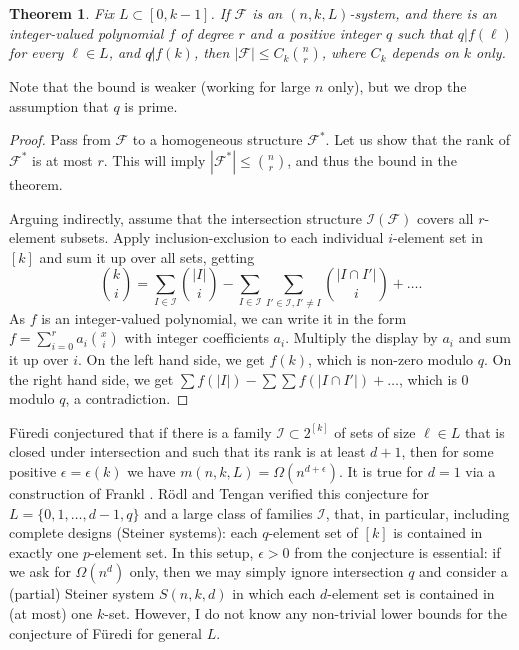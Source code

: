 \documentclass[graybox]{svmult}
\renewcommand{\le}{\leqslant}
\newcommand{\ff}{\mathcal{F}}
\newcommand{\m}{\mathcal}
\newtheorem{thm}{Theorem}
\begin{document}
\begin{thm}
   Fix $L\subset [0,k-1]$. If $\ff$ is an $(n,k,L)$-system, and there is an integer-valued polynomial  $f$ of degree $r$ and a positive integer  $q$ such that $q|f(\ell)$ for every $\ell\in L$, and $q\not | f(k)$, then $|\ff|\le C_k{n\choose r}$, where $C_k$ depends on $k$ only.
\end{thm}
Note that the bound is weaker (working for large $n$ only), but we drop the assumption that $q$ is prime.
\begin{proof}
  Pass from $\ff$ to a homogeneous structure $\ff^*$. Let us show that the rank of $\ff^*$ is at most $r$. This will imply $|\ff^*|\le {n\choose r}$, and thus the bound in the theorem.

  Arguing indirectly, assume that the intersection structure $\m I(\ff)$ covers all $r$-element subsets. Apply inclusion-exclusion to each individual $i$-element set in $[k]$ and sum it up over all sets, getting
  $${k\choose i} = \sum_{I\in \m I}{|I|\choose i}-\sum_{I\in \m I}\sum_{I'\in \m I, I'\ne I}{|I\cap I'|\choose i}+\ldots.$$
  As $f$ is an integer-valued polynomial, we can write it in the form $f = \sum_{i=0}^r a_i {x\choose i}$ with integer coefficients $a_i$. Multiply the display by $a_i$ and sum it up over $i$. On the left hand side, we get $f(k)$, which is non-zero modulo $q$. On the right hand side, we get $\sum f(|I|)-\sum \sum f(|I\cap I'|)+\ldots$, which is $0$ modulo $q$, a contradiction.
\end{proof}


F\"uredi \cite{Fur91} conjectured that if there is a family $\m I\subset 2^{[k]}$ of sets of size $\ell\in L$ that is closed under intersection and such that its rank is at least $d+1$, then for some positive $\epsilon = \epsilon(k)$ we have $m(n,k,L) = \Omega(n^{d+\epsilon})$. It is true for $d=1$ via a construction of Frankl \cite{Fra83}. R\"odl and Tengan \cite{RT} verified this conjecture for $L =\{0,1,\ldots, d-1, q\}$ and a large class of families $\m I$, that, in particular, including complete designs (Steiner systems): each $q$-element set of $[k]$ is contained in exactly one $p$-element set. In this setup, $\epsilon>0$ from the conjecture is essential: if we ask for $\Omega(n^{d})$ only, then we may simply ignore intersection $q$ and consider a (partial) Steiner system $S(n,k,d)$ in which each $d$-element set is contained in (at most) one $k$-set. However, I do not know any non-trivial lower bounds for the conjecture of F\"uredi for general $L$.
\end{document}
